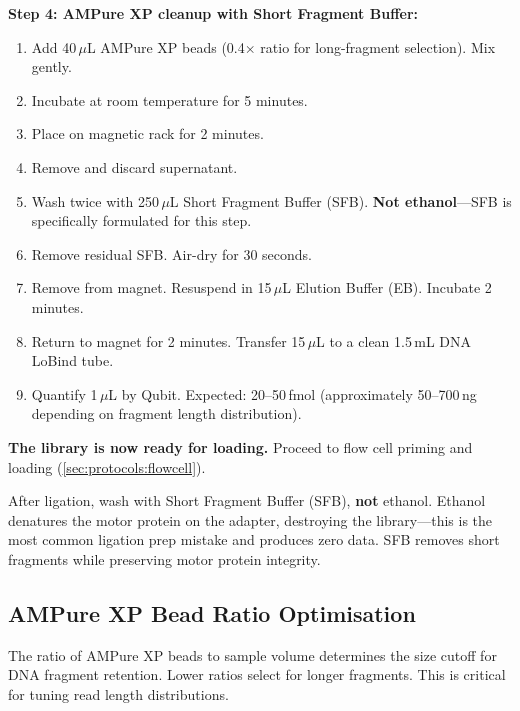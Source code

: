 \begin{protocolbox}[title={Protocol: Nanopore Ligation Sequencing (SQK-LSK114)}]
\textbf{Step 4: AMPure XP cleanup with Short Fragment Buffer:}
\begin{enumerate}[nosep, start=16]
  \item Add 40\,$\mu$L AMPure XP beads (0.4$\times$ ratio for long-fragment selection). Mix gently.
  \item Incubate at room temperature for 5 minutes.
  \item Place on magnetic rack for 2 minutes.
  \item Remove and discard supernatant.
  \item Wash twice with 250\,$\mu$L Short Fragment Buffer (SFB). \textbf{Not ethanol}---SFB is specifically formulated for this step.
  \item Remove residual SFB. Air-dry for 30 seconds.
  \item Remove from magnet. Resuspend in 15\,$\mu$L Elution Buffer (EB). Incubate 2 minutes.
  \item Return to magnet for 2 minutes. Transfer 15\,$\mu$L to a clean 1.5\,mL DNA LoBind tube.
  \item Quantify 1\,$\mu$L by Qubit. Expected: 20--50\,fmol (approximately 50--700\,ng depending on fragment length distribution).
\end{enumerate}

\textbf{The library is now ready for loading.} Proceed to flow cell priming and loading (\cref{sec:protocols:flowcell}).
\end{protocolbox}
\begin{warningbox}[title={Do Not Use Ethanol Washes After Ligation}]
After ligation, wash with Short Fragment Buffer (SFB), \textbf{not} ethanol. Ethanol denatures the motor protein on the adapter, destroying the library---this is the most common ligation prep mistake and produces zero data. SFB removes short fragments while preserving motor protein integrity.
\end{warningbox}

\subsection{AMPure XP Bead Ratio Optimisation}
\label{subsec:protocols:ampure}

The ratio of AMPure XP beads to sample volume determines the size cutoff for DNA fragment retention. Lower ratios select for longer fragments. This is critical for tuning read length distributions.

